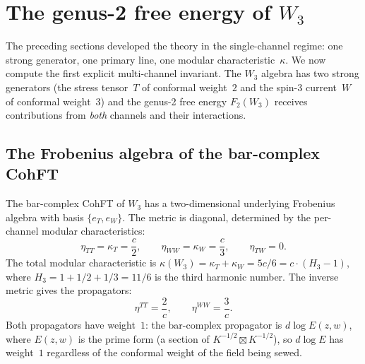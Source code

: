 

\section{The genus-2 free energy of \texorpdfstring{$W_3$}{W3}}
\label{sec:genus2-w3}

The preceding sections developed the theory in the single-channel
regime: one strong generator, one primary line, one modular
characteristic~$\kappa$. We now compute the first explicit
multi-channel invariant. The $W_3$ algebra has two strong
generators (the stress tensor~$T$ of conformal weight~$2$ and the
spin-3 current~$W$ of conformal weight~$3$) and the genus-2 free
energy $F_2(W_3)$ receives contributions from \emph{both} channels
and their interactions.

\subsection{The Frobenius algebra of the bar-complex CohFT}
\label{subsec:w3-frobenius}

The bar-complex CohFT of $W_3$ has a two-dimensional underlying
Frobenius algebra with basis $\{e_T, e_W\}$. The metric is diagonal,
determined by the per-channel modular characteristics:
\begin{equation}\label{eq:w3-metric}
\eta_{TT} = \kappa_T = \frac{c}{2},
\qquad
\eta_{WW} = \kappa_W = \frac{c}{3},
\qquad
\eta_{TW} = 0.
\end{equation}
The total modular characteristic is $\kappa(W_3) = \kappa_T + \kappa_W
= 5c/6 = c \cdot (H_3 - 1)$, where $H_3 = 1 + 1/2 + 1/3 = 11/6$
is the third harmonic number. The inverse metric gives the
propagators:
\begin{equation}\label{eq:w3-propagators}
\eta^{TT} = \frac{2}{c},
\qquad
\eta^{WW} = \frac{3}{c}.
\end{equation}
Both propagators have weight~$1$:
the bar-complex propagator is $d\!\log E(z,w)$, where
$E(z,w)$ is the prime form (a section of
$K^{-1/2} \boxtimes K^{-1/2}$), so $d\!\log E$ has weight~$1$
regardless of the conformal weight of the field being sewed.

